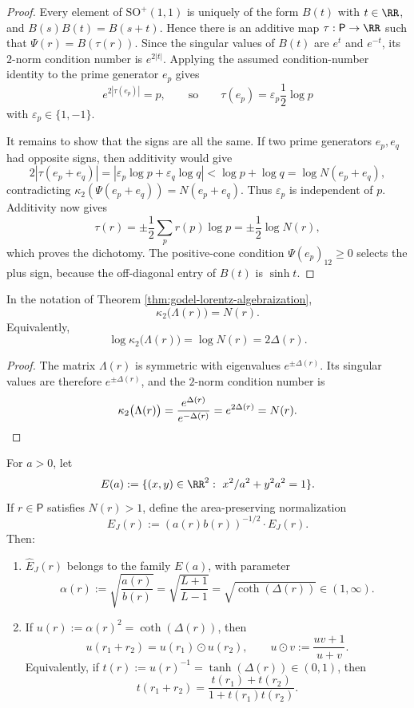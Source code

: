 \begin{proof}
Every element of \(\mathrm{SO}^+(1,1)\) is uniquely of the form \(B(t)\) with \(t\in\RR\), and \(B(s)B(t)=B(s+t)\). Hence there is an additive map \(\tau:\mathsf P\to\RR\) such that \(\Psi(r)=B(\tau(r))\). Since the singular values of \(B(t)\) are \(e^t\) and \(e^{-t}\), its \(2\)-norm condition number is \(e^{2|t|}\). Applying the assumed condition-number identity to the prime generator \(e_p\) gives
\[
e^{2|\tau(e_p)|}=p,
\qquad\text{so}\qquad
\tau(e_p)=\varepsilon_p\frac12\log p
\]
with \(\varepsilon_p\in\{1,-1\}\).

It remains to show that the signs are all the same. If two prime generators \(e_p,e_q\) had opposite signs, then additivity would give
\[
2|\tau(e_p+e_q)|=|\varepsilon_p\log p+\varepsilon_q\log q|<\log p+
\log q=\log N(e_p+e_q),
\]
contradicting \(\kappa_2(\Psi(e_p+e_q))=N(e_p+e_q)\). Thus \(\varepsilon_p\) is independent of \(p\). Additivity now gives
\[
\tau(r)=\pm\frac12\sum_p r(p)\log p=\pm\frac12\log N(r),
\]
which proves the dichotomy. The positive-cone condition \(\Psi(e_p)_{12}\ge0\) selects the plus sign, because the off-diagonal entry of \(B(t)\) is \(\sinh t\).
\end{proof}

\begin{corollary}\label{cor:godel-condition-number-identity}
In the notation of Theorem \ref{thm:godel-lorentz-algebraization},
\[
\kappa_2\bigl(\Lambda(r)\bigr)=N(r).
\]
Equivalently,
\[
\log\kappa_2\bigl(\Lambda(r)\bigr)=\log N(r)=2\Delta(r).
\]
\end{corollary}

\begin{proof}
The matrix \(\Lambda(r)\) is symmetric with eigenvalues \(e^{\pm\Delta(r)}\). Its singular values are therefore \(e^{\pm\Delta(r)}\), and the \(2\)-norm condition number is
\[
\kappa_2\bigl(\Lambda(r)\bigr)=\frac{e^{\Delta(r)}}{e^{-\Delta(r)}}=e^{2\Delta(r)}=N(r).
\qedhere
\]
\end{proof}

\begin{theorem}\label{thm:joukowsky-area-preserving-cayley}
For \(a>0\), let
\[
E(a):=\{(x,y)\in\RR^2:\ x^2/a^2+y^2a^2=1\}.
\]
If \(r\in\mathsf P\) satisfies \(N(r)>1\), define the area-preserving normalization
\[
\widehat E_J(r):=(a(r)b(r))^{-1/2}\cdot E_J(r).
\]
Then:
\begin{enumerate}
  \item \(\widehat E_J(r)\) belongs to the family \(E(a)\), with parameter
  \[
  \alpha(r):=\sqrt{\frac{a(r)}{b(r)}}
  =\sqrt{\frac{L+1}{L-1}}
  =\sqrt{\coth(\Delta(r))}\in(1,\infty).
  \]

  \item If \(u(r):=\alpha(r)^2=\coth(\Delta(r))\), then
  \[
  u(r_1+r_2)=u(r_1)\odot u(r_2),
  \qquad
  u\odot v:=\frac{uv+1}{u+v}.
  \]
  Equivalently, if \(t(r):=u(r)^{-1}=\tanh(\Delta(r))\in(0,1)\), then
  \[
  t(r_1+r_2)=\frac{t(r_1)+t(r_2)}{1+t(r_1)t(r_2)}.
  \]
\end{enumerate}
\end{theorem}

